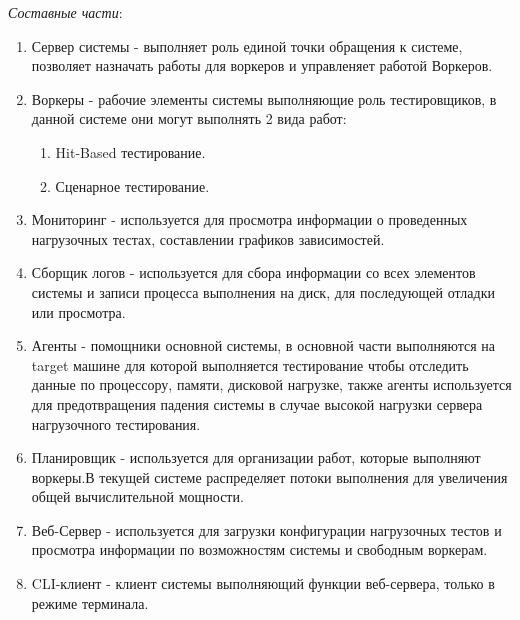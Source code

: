 \documentclass[PI,LAB]{HSEUniversity}
\begin{document}
\emph{Составные части}:\begin{enumerate}  
	\item Сервер системы - выполняет роль единой точки обращения к системе, позволяет назначать работы для воркеров и управленяет работой Воркеров.
	\item Воркеры - рабочие элементы системы выполняющие роль тестировщиков, в данной системе  они могут выполнять 2 вида работ:
	\begin{enumerate}
		\item Hit-Based тестирование.
		\item Сценарное тестирование.
	\end{enumerate} 
	\item Мониторинг - используется для просмотра информации о проведенных нагрузочных тестах, составлении графиков зависимостей.
	\item Сборщик логов - используется для сбора информации со всех элементов системы и записи процесса выполнения на диск, для последующей отладки или просмотра.
	\item Агенты - помощники основной системы, в основной части выполняются на target машине для которой выполняется тестирование чтобы отследить данные по процессору, памяти, дисковой нагрузке, также агенты  используется для предотвращения падения системы в случае высокой нагрузки сервера нагрузочного тестирования.
	\item Планировщик - используется для организации работ, которые выполняют воркеры.В текущей системе распределяет потоки выполнения для увеличения общей вычислительной мощности.
	\item Веб-Сервер - используется для загрузки конфигурации нагрузочных тестов и просмотра информации по возможностям системы и свободным воркерам.
	\item CLI-клиент - клиент системы выполняющий функции веб-сервера, только в режиме терминала.
\end{enumerate}


	
\end{document}
